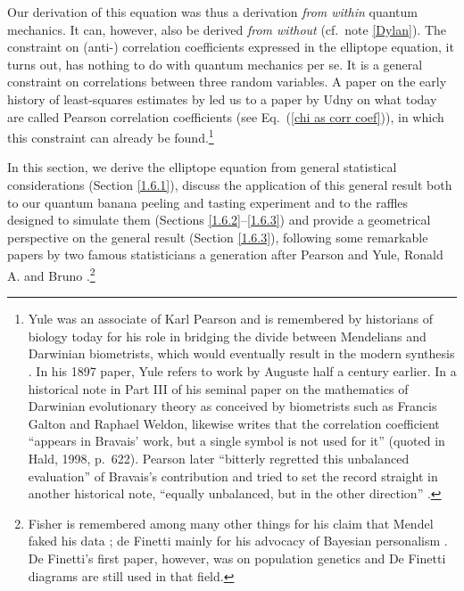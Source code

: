Our derivation of this equation was thus a derivation \emph{from within} quantum mechanics. It can, however, also be derived \emph{from without} (cf.\ note \ref{Dylan}).
The constraint on (anti-) correlation coefficients expressed in the elliptope equation, it turns out, has nothing to do with quantum mechanics per se. It is a general constraint on correlations between three random variables. A paper on the early history of least-squares estimates by \citet{Aldrich 1998} led us to a paper by Udny \citet[p.\ 487]{Yule 1896} on what today are called Pearson correlation coefficients (see Eq.\ (\ref{chi as corr coef})), in which this constraint can already be found.\footnote{Yule was an associate of Karl Pearson and is remembered by historians of biology today for his role in bridging the divide between Mendelians and Darwinian biometrists, which would eventually result in the modern synthesis \citep[p.\ 329]{Bowler 2003}. In his 1897 paper, Yule refers to work by  Auguste \citet{Bravais 1846} half a century earlier. In a historical note in Part III of his seminal paper on the mathematics of Darwinian evolutionary theory as conceived by biometrists such as Francis Galton and Raphael Weldon, \citet{Pearson 1896} likewise writes that the correlation coefficient ``appears in Bravais' work, but a single symbol is not used for it'' (quoted in Hald, 1998, p.\ 622). Pearson later ``bitterly regretted this unbalanced evaluation'' of Bravais's contribution and tried to set the record straight in another historical note, ``equally unbalanced, but in the other direction'' \citep[p.\ 623; see Pearson, 1921, p.\ 191]{Hald 1998}.\label{biometrist}} 

In this section, we derive the elliptope equation from general statistical considerations (Section \ref{1.6.1}), discuss the application of this general result both to our quantum banana peeling and tasting experiment and to the raffles designed to simulate them (Sections \ref{1.6.2}--\ref{1.6.3}) and provide a geometrical perspective on the general result (Section \ref{1.6.3}), following some remarkable papers by two famous statisticians a generation after Pearson and Yule, Ronald A. \citet{Fisher 1915, Fisher 1924} and  Bruno \citet{De Finetti 1937}.\footnote{Fisher is remembered among many other things for his claim that Mendel faked his data \citep{Franklin et al 2008}; de Finetti mainly for his advocacy of Bayesian personalism \citep{McGrayne 2011}. De Finetti's first paper, however, was on population genetics and De Finetti diagrams are still used in that field.\label{mendel}}

